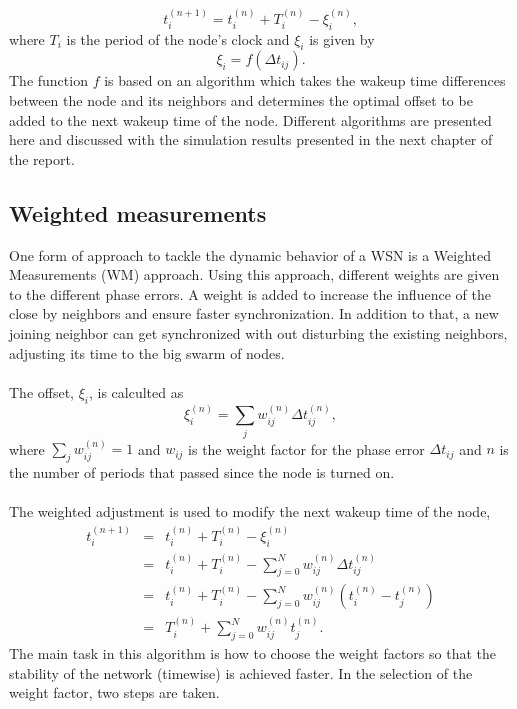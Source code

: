 \documentclass[a4paper,10pt]{report}
\begin{document}
\begin{equation}
t_i^{(n+1)} = t_i^{(n)} + T_i^{(n)} - \xi_i^{(n)} ,
\end{equation}
where $T_i$ is the period of the node's clock and $\xi_i$ is given by
\begin{equation}
\xi_i = f(\Delta t_{ij}).
\end{equation}
The function $f$ is based on an algorithm which takes the wakeup
time differences between the node and its neighbors and determines
the optimal offset to be added to the next wakeup time of the node.
\newline Different algorithms are presented here and discussed with the simulation results presented in the next chapter of the report.
\subsection{\textbf{Weighted measurements}}
One form of approach to tackle the dynamic behavior of a WSN is a Weighted Measurements (WM) approach. Using this approach, different weights are given to the different phase errors. A weight is added to increase the influence of the close by neighbors and ensure faster synchronization. In addition to that, a new joining neighbor can get synchronized with out disturbing the existing neighbors, adjusting its time to the big swarm of nodes. \paragraph*{}
The offset, $\xi_i$, is calculted as
\begin{equation}
\xi_i^{(n)} = \sum_j{w_{ij}^{(n)}\Delta t_{ij}^{(n)}} ,
\end{equation}
where $\sum_j{w_{ij}^{(n)}= 1}$ and $w_{ij}$ is the weight factor
for the phase error $\Delta t_{ij}$ and $n$ is the number of periods
that passed since the node is turned on.
\paragraph*{}
The weighted adjustment is used to modify the next wakeup time of the node,
\begin{eqnarray*}
t_i^{(n+1)} &=& t_i^{(n)} + T_i^{(n)} - \xi_i^{(n)} \\ &=& t_i^{(n)}
+ T_i^{(n)} - \sum_{j=0}^N{w_{ij}^{(n)}\Delta t_{ij}^{(n)}} \\ &=&
t_i^{(n)}+ T_i^{(n)} -
\sum_{j=0}^N{w_{ij}^{(n)}(t_i^{(n)}-t_j^{(n)})} \\ &=& T_i^{(n)} + \sum_{j=0}^N{w_{ij}^{(n)}t_j^{(n)}}.
\end{eqnarray*}
The main task in this algorithm is how to choose the weight factors
so that the stability of the network (timewise) is achieved faster.
In the selection of the weight factor, two steps are taken.
\end{document}
